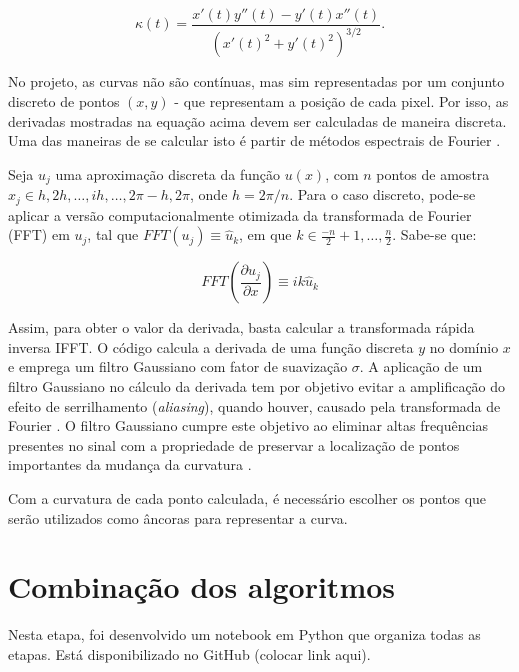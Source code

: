 \begin{equation}
	\kappa (t) = \frac{x'(t) y''(t) - y'(t) x''(t)}{(x'(t)^2 + y'(t)^2)^{3/2}}.
\end{equation}

No projeto, as curvas não são contínuas, mas sim representadas por um conjunto discreto de pontos $(x, y)$ - que representam a posição de cada pixel. Por isso, as derivadas mostradas na equação acima devem ser calculadas de maneira discreta. Uma das maneiras de se calcular isto é partir de métodos espectrais de Fourier \cite{brethwashington}.

Seja $u_j$ uma aproximação discreta da função $u(x)$, com $n$ pontos de amostra $x_j \in h, 2h, \dots, ih, \dots, 2\pi - h, 2\pi$, onde $h = 2\pi/n$. Para o caso discreto, pode-se aplicar a versão computacionalmente otimizada da transformada de Fourier (FFT) em $u_j$, tal que $FFT(u_j) \equiv \hat{u}_k$, em que $k \in \frac{-n}{2}+1, \dots, \frac{n}{2}$. Sabe-se que:

$$FFT \left (\frac{\partial u_j}{\partial x} \right) \equiv i k \hat{u}_k$$

Assim, para obter o valor da derivada, basta calcular a transformada rápida inversa IFFT. O código calcula a derivada de uma função discreta $y$ no domínio $x$ e emprega um filtro Gaussiano com fator de suavização $\sigma$. A aplicação de um filtro Gaussiano no cálculo da derivada tem por objetivo evitar a amplificação do efeito de serrilhamento (\textit{aliasing}), quando houver, causado pela transformada de Fourier \cite{li1987}. O filtro Gaussiano cumpre este objetivo ao eliminar altas frequências presentes no sinal com a propriedade de preservar a localização de pontos importantes da mudança da curvatura \cite{tomasi2007}.

Com a curvatura de cada ponto calculada, é necessário escolher os pontos que serão utilizados como âncoras para representar a curva. 


\section{Combinação dos algoritmos}\label{sec:combinacao}

Nesta etapa, foi desenvolvido um notebook em Python que organiza todas as etapas. Está disponibilizado no GitHub (colocar link aqui).


